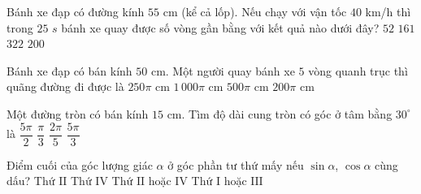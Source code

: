 \begin{ex}%
	Bánh xe đạp có đường kính $55$ cm (kể cả lốp). Nếu chạy với vận tốc $40$ km/h thì trong $25$ $s$ bánh xe quay  được số vòng gần bằng với kết quả nào dưới đây?
	\choice 
		 {$52$}
		 {\True $161$}
		{$322$} 
		{$200$} 
\end{ex}

\begin{ex}%
	Bánh xe đạp có bán kính $50$ cm. Một người quay bánh xe $5$ vòng quanh trục thì quãng đường  đi được là
	\choice 
		{$250\pi$  cm}
		{$1\,000\pi$ cm} 
		 {\True $500\pi$ cm}
		{$200\pi$  cm}
\end{ex}

\begin{ex}%
	Một đường tròn có bán kính $15$ cm. Tìm độ dài cung tròn có góc ở tâm bằng  $30^{\circ}$ là
	 \choice
		{\True $\dfrac{5\pi}{2}$} 
		{$\dfrac{\pi}{3}$} 
		{$\dfrac{2\pi}{5}$} 
		{$\dfrac{5\pi}{3}$} 
\end{ex}

\begin{ex}%
	Điểm cuối của góc lượng giác $\alpha$ ở góc phần tư thứ mấy nếu $\sin \alpha$, $ \cos \alpha$ cùng dấu? 
	 \choice
		{Thứ $\mathrm{II}  $}
		{Thứ  $\mathrm{IV} $}
		{Thứ $\mathrm{II}$  hoặc $\mathrm{IV} $}
		{\True  Thứ $\mathrm{I}$ hoặc $\mathrm{III} $}
\end{ex}

